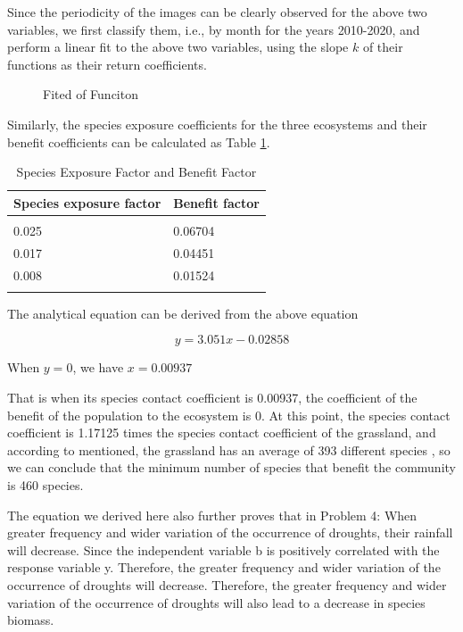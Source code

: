 \documentclass[12pt]{article}
\begin{document}
Since the periodicity of the images can be clearly observed for the above two variables, we first classify them, i.e., by month for the years 2010-2020, and perform a linear fit to the above two variables, using the slope $k$ of their functions as their return coefficients.

\begin{figure}[htb]
	\centering
	
	\caption{Fited of Funciton}
	\label{fig:slope1}
\end{figure}

Similarly, the species exposure coefficients for the three ecosystems and their benefit coefficients can be calculated as Table \ref{tab:factor}.

\begin{table}[]
	\centering
	\caption{Species Exposure Factor and Benefit Factor}

	\begin{tabular}{@{}ll@{}}
		\toprule
		Species exposure factor & Benefit factor \\
		\midrule                                 \\
		0.025                   & 0.06704        \\
		0.017                   & 0.04451        \\
		0.008                   & 0.01524        \\
		\bottomrule                              \\
	\end{tabular}
	\label{tab:factor}
\end{table}

The analytical equation can be derived from the above equation

\begin{equation}
	y = 3.051x - 0.02858
\end{equation}

When $y = 0$, we have $x = 0.00937$

That is when its species contact coefficient is 0.00937, the coefficient of the benefit of the population to the ecosystem is 0. At this point, the species contact coefficient is 1.17125 times the species contact coefficient of the grassland, and according to mentioned, the grassland has an average of 393 different species \cite{wang2017biogeographic}, so we can conclude that the minimum number of species that benefit the community is 460 species.

The equation we derived here also further proves that in Problem 4: When greater frequency and wider variation of the occurrence of droughts, their rainfall will decrease. Since the independent variable b is positively correlated with the response variable y. Therefore, the greater frequency and wider variation of the occurrence of droughts will decrease. Therefore, the greater frequency and wider variation of the occurrence of droughts will also lead to a decrease in species biomass.
\end{document}
